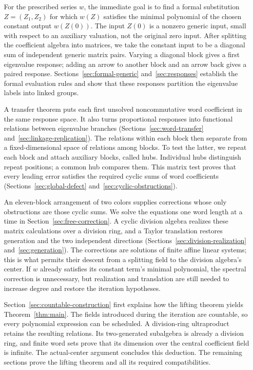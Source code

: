 For the prescribed series $w$, the immediate goal is to find a formal
substitution $Z=(Z_1,Z_2)$ for which $w(Z)$ satisfies the minimal
polynomial of the chosen constant output $w(Z(0))$. The input $Z(0)$
is a nonzero generic input, small with respect to an auxiliary valuation,
not the original zero input.
After splitting
the coefficient algebra into matrices, we take the constant input to be
a diagonal sum of independent generic matrix pairs. Varying a diagonal
block gives a first eigenvalue response; adding an arrow to another block
and an arrow back gives a paired response. Sections~\ref{sec:formal-generic}
and~\ref{sec:responses} establish the formal evaluation rules and show that
these responses partition the eigenvalue labels into linked groups.

A transfer theorem puts each first unsolved noncommutative word coefficient
in the same response space. It also turns proportional responses into
functional relations between eigenvalue branches
(Sections~\ref{sec:word-transfer} and~\ref{sec:linkage-replication}).
The relations within each block then separate from a fixed-dimensional
space of relations among blocks. To test the latter, we repeat each block
and attach auxiliary blocks, called hubs. Individual hubs distinguish
repeat positions; a common hub compares them. This matrix test proves
that every leading error satisfies the required cyclic sums of word
coefficients (Sections~\ref{sec:global-defect} and~\ref{sec:cyclic-obstructions}).

An eleven-block arrangement of two colors supplies corrections whose
only obstructions are those cyclic sums. We solve the equations one word
length at a time in Section~\ref{sec:free-correction}. A cyclic division
algebra realizes these matrix calculations over a division ring, and a
Taylor translation restores generation and the two independent directions
(Sections~\ref{sec:division-realization} and~\ref{sec:generation}).
The corrections are solutions of finite affine linear systems; this is
what permits their descent from a splitting field to the division
algebra's center. If $w$ already satisfies its constant term's minimal
polynomial, the spectral correction is unnecessary, but realization
and translation are still needed to increase degree and restore the
iteration hypotheses.

Section~\ref{sec:countable-construction} first explains how the lifting
theorem yields Theorem~\ref{thm:main}. The fields introduced during the
iteration are countable, so every polynomial expression can be scheduled.
A division-ring ultraproduct retains the resulting relations. Its
two-generated subalgebra is already a division ring, and finite word
sets prove that its dimension over the central coefficient field is
infinite. The actual-center argument concludes this deduction. The
remaining sections prove the lifting theorem and all its required
compatibilities.
